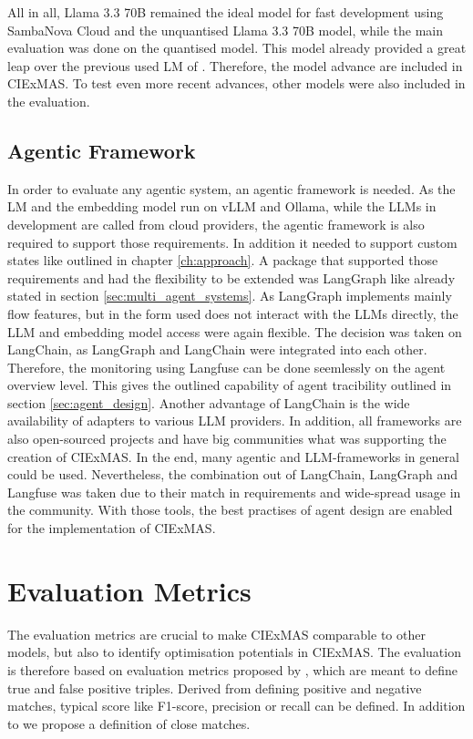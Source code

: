 \documentclass[a4paper,oneside,bibliography=totoc]{scrbook}
\begin{document}
All in all, Llama 3.3 70B remained the ideal model for fast development using SambaNova Cloud and the unquantised Llama 3.3 70B model, while the main evaluation was done on the quantised model. This model already provided a great leap over the previous used \ac{LM} of \citet{Josifoski2023}. Therefore, the model advance are included in CIExMAS. To test even more recent advances, other models were also included in the evaluation.

\subsection{Agentic Framework}
\label{subsec:agentic_framework}
In order to evaluate any agentic system, an agentic framework is needed. As the \ac{LM} and the embedding model run on vLLM and Ollama, while the \acp{LLM} in development are called from cloud providers, the agentic framework is also required to support those requirements. In addition it needed to support custom states like outlined in chapter \ref{ch:approach}.
A package that supported those requirements and had the flexibility to be extended was LangGraph like already stated in section \ref{sec:multi_agent_systems}. As LangGraph implements mainly flow features, but in the form used does not interact with the \acp{LLM} directly, the \ac{LLM} and embedding model access were again flexible. The decision was taken on LangChain, as LangGraph and LangChain were integrated into each other. Therefore, the monitoring using Langfuse can be done seemlessly on the agent overview level. This gives the outlined capability of agent tracibility outlined in section \ref{sec:agent_design}. Another advantage of LangChain is the wide availability of adapters to various LLM providers. In addition, all frameworks are also open-sourced projects and have big communities what was supporting the creation of CIExMAS.
In the end, many agentic and \ac{LLM}-frameworks in general could be used. Nevertheless, the combination out of LangChain, LangGraph and Langfuse was taken due to their match in requirements and wide-spread usage in the community. With those tools, the best practises of agent design are enabled for the implementation of CIExMAS.

\section{Evaluation Metrics}
\label{sec:evaluation_metrics}
The evaluation metrics are crucial to make CIExMAS comparable to other models, but also to identify optimisation potentials in CIExMAS. The evaluation is therefore based on evaluation metrics proposed by \citet{Josifoski2021}, which are meant to define true and false positive triples. Derived from defining positive and negative matches, typical score like F1-score, precision or recall can be defined. In addition to \citet{Josifoski2021} we propose a definition of close matches.
\end{document}
